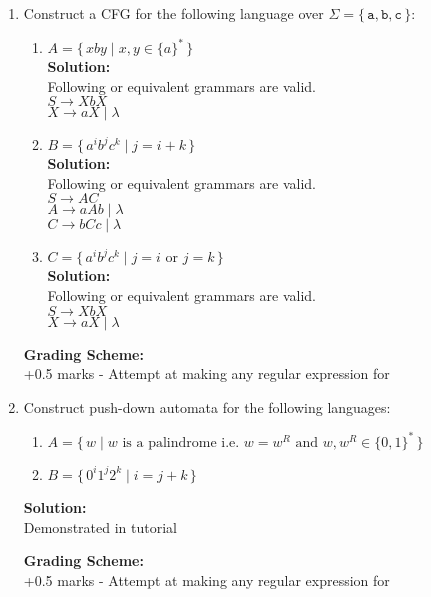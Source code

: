\documentclass[11pt, article, oneside]{memoir}
\newcommand{\set}[1]{\{\, #1\, \}}
\begin{document}
\begin{enumerate}
    \item
        Construct a CFG for the following language over \(\Sigma = \set{\texttt{a}, \texttt{b}, \texttt{c}}\):
        \begin{enumerate}
            \item
                \(A = \set{xby \mid x, y \in \{a\}^*}\) 
                \\\textbf{Solution:}
                \\Following or equivalent grammars are valid.
                \\\(S \rightarrow XbX\)
                \\\(X \rightarrow aX \mid \lambda\)
            \item
                \(B = \set{ {a^i}{b^j}{c^k} \mid j = i + k}\)
                \\\textbf{Solution:}
                \\Following or equivalent grammars are valid.
                \\\(S \rightarrow AC\)
                \\\(A \rightarrow aAb \mid \lambda\)
                \\\(C \rightarrow bCc \mid \lambda\)
            \item
                \(C = \set{ {a^i}{b^j}{c^k} \mid j = i \text{ or } j = k}\)
                \\\textbf{Solution:}
                \\Following or equivalent grammars are valid.
                \\\(S \rightarrow XbX\)
                \\\(X \rightarrow aX \mid \lambda\)
        \end{enumerate}

        \textbf{Grading Scheme:}
        \\+0.5 marks - Attempt at making any regular expression for
        
    \item
        Construct push-down automata for the following languages:
        \begin{enumerate}
            \item
                \(A = \set{w \mid w \text{ is a palindrome i.e. } w = w^R \text{ and } w, w^R \in \{0, 1\}^*}\) 
            \item
                \(B = \set{ {0^i}{1^j}{2^k} \mid i = j + k}\)
        \end{enumerate}

        \textbf{Solution:}
        \\Demonstrated in tutorial

        \textbf{Grading Scheme:}
        \\+0.5 marks - Attempt at making any regular expression for
        
\end{enumerate}
\end{document}
